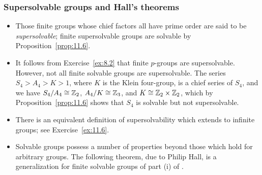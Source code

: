 \documentclass[../Odyssey_Project.tex]{subfiles}
\begin{document}
\subsubsection*{Supersolvable groups and Hall's theorems}
\begin{itemize}
    \item Those finite groups whose chief factors all have prime order are said to be \emph{supersolvable}; finite supersolvable groups are solvable by Proposition~\ref{prop:11.6}.
    \item It follows from Exercise~\ref{ex:8.2} that finite $p$-groups are supersolvable. However, not all finite solvable groups are supersolvable. The series $S_4 > A_4 > K > 1$, where $K$ is the Klein four-group, is a chief series of $S_4$, and we have $S_4/A_4 \cong \mathbb{Z}_2$, $A_4/K \cong \mathbb{Z}_3$, and $K \cong \mathbb{Z}_2 \times \mathbb{Z}_2$, which by Proposition~\ref{prop:11.6} shows that $S_4$ is solvable but not supersolvable.
    \item There is an equivalent definition of supersolvability which extends to infinite groups; see Exercise~\ref{ex:11.6}.
    \item Solvable groups possess a number of properties beyond those which hold for arbitrary groups. The following theorem, due to Philip Hall, is a generalization for finite solvable groups of part (i) of .
\end{itemize}
\end{document}
